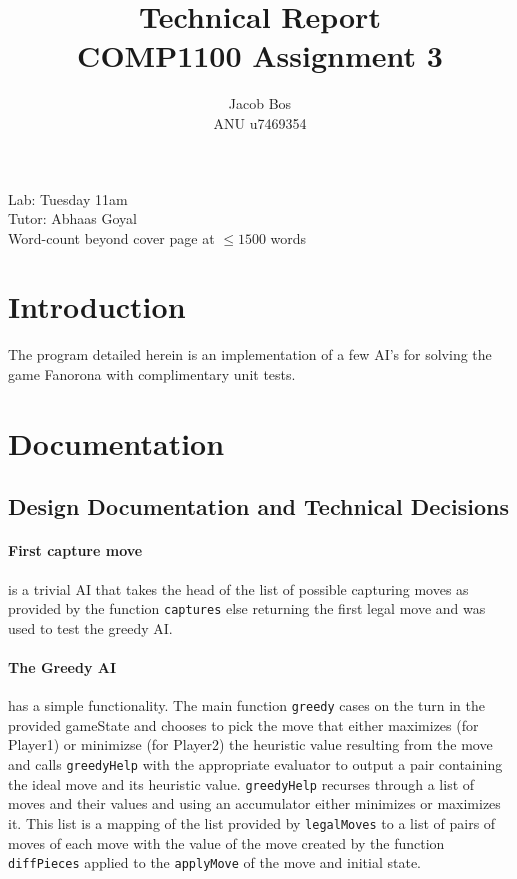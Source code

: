 \documentclass[11pt]{article}
\title{Technical Report\\ COMP1100 Assignment 3}
\author{Jacob Bos\\ ANU u7469354}
\begin{document}
\maketitle
{}
\begin{center}
  Lab: Tuesday 11am\\
  Tutor: Abhaas Goyal\\
  Word-count beyond cover page at $\leq 1500$ words
\end{center}
\tableofcontents
\newpage
{}
\section{Introduction} 
The program detailed herein is an implementation of a few AI's for solving the game Fanorona with complimentary unit tests.


\section{Documentation}%
\subsection{Design Documentation and Technical Decisions}
\paragraph*{First capture move} is a trivial AI that takes the head of the list of possible capturing moves as provided by the function \verb|captures| else returning the first legal move and was used to test the greedy AI.

\paragraph{The Greedy AI} has a simple functionality. The main function \verb|greedy| cases on the turn in the provided gameState and chooses to pick the move that either maximizes (for Player1) or minimizse (for Player2) the heuristic value resulting from the move and calls \verb|greedyHelp| with the appropriate evaluator to output a pair containing the ideal move and its heuristic value. \verb|greedyHelp| recurses through a list of moves and their values and using an accumulator either minimizes or maximizes it. This list is a mapping of the list provided by \verb|legalMoves| to a list of pairs of moves of each move with the value of the move created by the function \verb|diffPieces| applied to the \verb|applyMove| of the move and initial state.
\end{document}
